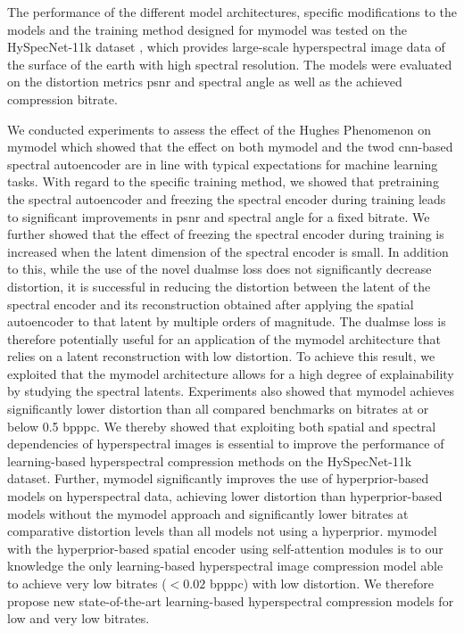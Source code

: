 The performance of the different model architectures, specific modifications to the models and the training method designed for \ac{mymodel} was tested on the HySpecNet-11k dataset \citep{fuchs_hyspecnet-11k_2023}, which provides large-scale hyperspectral image data of the surface of the earth with high spectral resolution. The models were evaluated on the distortion metrics \ac{psnr} and spectral angle as well as the achieved compression bitrate.

We conducted experiments to assess the effect of the Hughes Phenomenon on \ac{mymodel} which showed that the effect on both \ac{mymodel} and the \ac{twod} \ac{cnn}-based spectral autoencoder are in line with typical expectations for machine learning tasks. With regard to the specific training method, we showed that pretraining the spectral autoencoder and freezing the spectral encoder during training leads to significant improvements in \ac{psnr} and spectral angle for a fixed bitrate. We further showed that the effect of freezing the spectral encoder during training is increased when the latent dimension of the spectral encoder is small. In addition to this, while the use of the novel \ac{dualmse} loss does not significantly decrease distortion, it is successful in reducing the distortion between the latent of the spectral encoder and its reconstruction obtained after applying the spatial autoencoder to that latent by multiple orders of magnitude. The \ac{dualmse} loss is therefore potentially useful for an application of the \ac{mymodel} architecture that relies on a latent reconstruction with low distortion. To achieve this result, we exploited that the \ac{mymodel} architecture allows for a high degree of explainability by studying the spectral latents. Experiments also showed that \ac{mymodel} achieves significantly lower distortion than all compared benchmarks on bitrates at or below 0.5 bpppc. We thereby showed that exploiting both spatial and spectral dependencies of hyperspectral images is essential to improve the performance of learning-based hyperspectral compression methods on the HySpecNet-11k dataset. Further, \ac{mymodel} significantly improves the use of hyperprior-based models on hyperspectral data, achieving lower distortion than hyperprior-based models without the \ac{mymodel} approach and significantly lower bitrates at comparative distortion levels than all models not using a hyperprior. \ac{mymodel} with the hyperprior-based spatial encoder using self-attention modules is to our knowledge the only learning-based hyperspectral image compression model able to achieve very low bitrates ($<0.02$ \ac{bpppc}) with low distortion. We therefore propose new state-of-the-art learning-based hyperspectral compression models for low and very low bitrates.

